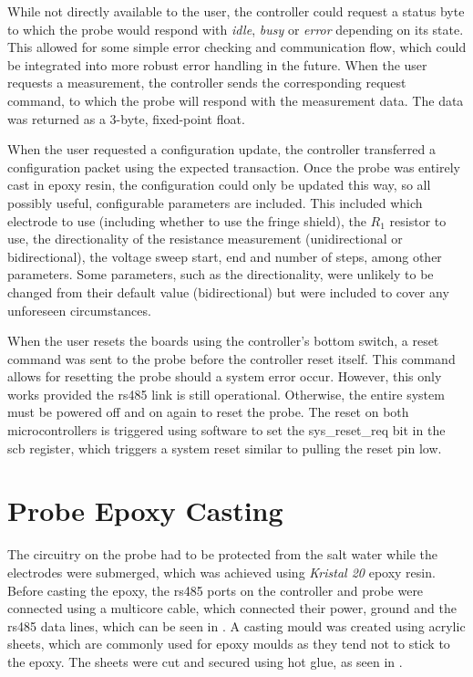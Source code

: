 While not directly available to the user, the controller could request a status byte to which the probe would respond with \textit{idle}, \textit{busy} or \textit{error} depending on its state.
This allowed for some simple error checking and communication flow, which could be integrated into more robust error handling in the future.
When the user requests a measurement, the controller sends the corresponding request command, to which the probe will respond with the measurement data.
The data was returned as a 3-byte, fixed-point float.

When the user requested a configuration update, the controller transferred a configuration packet using the expected transaction.
Once the probe was entirely cast in epoxy resin, the configuration could only be updated this way, so all possibly useful, configurable parameters are included.
This included which electrode to use (including whether to use the fringe shield), the $R_1$ resistor to use, the directionality of the resistance measurement (unidirectional or bidirectional), the voltage sweep start, end and number of steps, among other parameters.
Some parameters, such as the directionality, were unlikely to be changed from their default value (bidirectional) but were included to cover any unforeseen circumstances.

When the user resets the boards using the controller's bottom switch, a reset command was sent to the probe before the controller reset itself.
This command allows for resetting the probe should a system error occur.
However, this only works provided the \gls{rs485} link is still operational.
Otherwise, the entire system must be powered off and on again to reset the probe.
The reset on both microcontrollers is triggered using software to set the \gls{sys_reset_req} bit in the \gls{scb} register, which triggers a system reset similar to pulling the reset pin low.

\section{Probe Epoxy Casting}\label{sec:probe-epoxy-casting}

The circuitry on the probe had to be protected from the salt water while the electrodes were submerged, which was achieved using \textit{Kristal 20} epoxy resin.
Before casting the epoxy, the \gls{rs485} ports on the controller and probe were connected using a multicore cable, which connected their power, ground and the \gls{rs485} data lines, which can be seen in .
A casting mould was created using acrylic sheets, which are commonly used for epoxy moulds as they tend not to stick to the epoxy.
The sheets were cut and secured using hot glue, as seen in .

